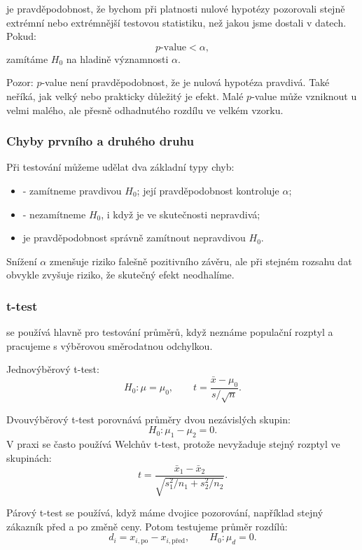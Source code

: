  je pravděpodobnost, že bychom při platnosti nulové hypotézy pozorovali stejně
extrémní nebo extrémnější testovou statistiku, než jakou jsme dostali v datech. Pokud:
\[
  p\text{-value}<\alpha,
\]
zamítáme \(H_0\) na hladině významnosti \(\alpha\).

Pozor: \(p\)-value není pravděpodobnost, že je nulová hypotéza pravdivá. Také neříká, jak velký nebo
prakticky důležitý je efekt. Malé \(p\)-value může vzniknout u velmi malého, ale přesně odhadnutého
rozdílu ve velkém vzorku.

\subsubsection{Chyby prvního a druhého druhu}
Při testování můžeme udělat dva základní typy chyb:
\begin{itemize}
  \item {} - zamítneme pravdivou \(H_0\); její pravděpodobnost kontroluje
  \(\alpha\);
  \item {} - nezamítneme \(H_0\), i když je ve skutečnosti nepravdivá;
  \item {} je pravděpodobnost správně zamítnout nepravdivou \(H_0\).
\end{itemize}

Snížení \(\alpha\) zmenšuje riziko falešně pozitivního závěru, ale při stejném rozsahu dat obvykle
zvyšuje riziko, že skutečný efekt neodhalíme.

\subsubsection{t-test}
 se používá hlavně pro testování průměrů, když neznáme populační rozptyl a pracujeme s
výběrovou směrodatnou odchylkou.

Jednovýběrový t-test:
\[
  H_0:\mu=\mu_0,
  \qquad
  t=\frac{\bar{x}-\mu_0}{s/\sqrt{n}}.
\]

Dvouvýběrový t-test porovnává průměry dvou nezávislých skupin:
\[
  H_0:\mu_1-\mu_2=0.
\]
V praxi se často používá Welchův t-test, protože nevyžaduje stejný rozptyl ve skupinách:
\[
  t=
  \frac{\bar{x}_1-\bar{x}_2}
  {\sqrt{s_1^2/n_1+s_2^2/n_2}}.
\]

Párový t-test se používá, když máme dvojice pozorování, například stejný zákazník před a po změně
ceny. Potom testujeme průměr rozdílů:
\[
  d_i=x_{i,\text{po}}-x_{i,\text{před}},
  \qquad
  H_0:\mu_d=0.
\]


